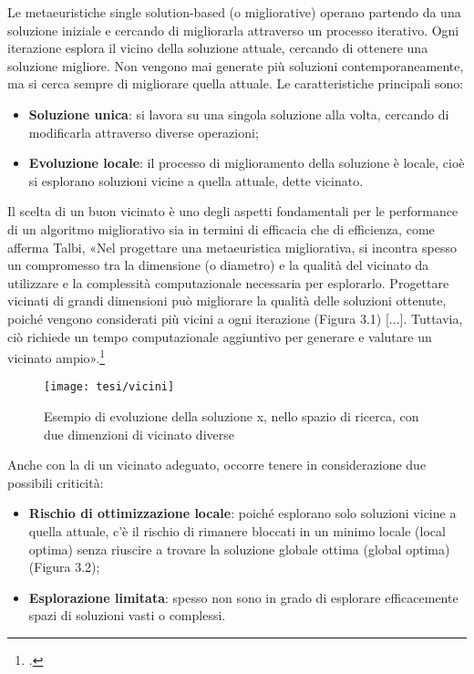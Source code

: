 Le metaeuristiche single solution-based (o migliorative) operano partendo da una soluzione iniziale e cercando di migliorarla attraverso un processo iterativo. Ogni iterazione esplora il vicino della soluzione attuale, cercando di ottenere una soluzione migliore. Non vengono mai generate più soluzioni contemporaneamente, ma si cerca sempre di migliorare quella attuale. Le caratteristiche principali sono:
\begin{itemize}
    \item \textbf{Soluzione unica}: si lavora su una singola soluzione alla volta, cercando di modificarla attraverso diverse operazioni;
    \item \textbf{Evoluzione locale}: il processo di miglioramento della soluzione è locale, cioè si esplorano soluzioni vicine a quella attuale, dette vicinato.
\end{itemize}

Il scelta di un buon vicinato è uno degli aspetti fondamentali per le performance di un algoritmo migliorativo sia in termini di efficacia che di efficienza, come afferma Talbi, «Nel progettare una metaeuristica migliorativa, si incontra spesso un compromesso tra la dimensione (o diametro) e la qualità del vicinato da utilizzare e la complessità computazionale necessaria per esplorarlo. Progettare vicinati di grandi dimensioni può migliorare la qualità delle soluzioni ottenute, poiché vengono considerati più vicini a ogni iterazione (Figura 3.1) [...]. Tuttavia, ciò richiede un tempo computazionale aggiuntivo per generare e valutare un vicinato ampio».\footcite{talbi:ssb}
\begin{figure}[!ht] 
    \centering 
    \texttt{[image: tesi/vicini]} 
    \caption{Esempio di evoluzione della soluzione x, nello spazio di ricerca, con due dimenzioni di vicinato diverse}
\end{figure}

Anche con la di un vicinato adeguato, occorre tenere in considerazione due possibili criticità:
\begin{itemize}
    \item \textbf{Rischio di ottimizzazione locale}: poiché esplorano solo soluzioni vicine a quella attuale, c'è il rischio di rimanere bloccati in un minimo locale (local optima) senza riuscire a trovare la soluzione globale ottima (global optima) (Figura 3.2);
    \item \textbf{Esplorazione limitata}: spesso non sono in grado di esplorare efficacemente spazi di soluzioni vasti o complessi.
\end{itemize}

